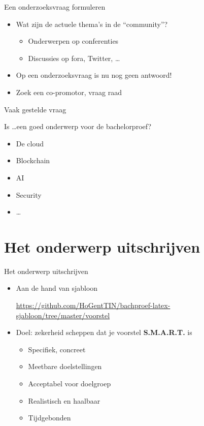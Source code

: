 \documentclass[aspectratio=169]{beamer}
\begin{document}
\begin{frame}{Een onderzoeksvraag formuleren}
  
  \begin{itemize}
    \item Wat zijn de actuele thema's in de ``community''?
    \begin{itemize}
      \item Onderwerpen op conferenties
      \item Discussies op fora, Twitter, \ldots
    \end{itemize}
    \item Op een onderzoeksvraag is nu nog geen antwoord!
    \item Zoek een co-promotor, vraag raad
  \end{itemize}
  
\end{frame}

\begin{frame}{Vaak gestelde vraag}
  
  Is \ldots een goed onderwerp voor de bachelorproef?
  
  \begin{itemize}
    \item De cloud
    \item Blockchain
    \item AI
    \item Security
    \item \ldots
  \end{itemize}
  
\end{frame}

\section{Het onderwerp uitschrijven}

\begin{frame}{Het onderwerp uitschrijven}
  
  \begin{itemize}
    \item Aan de hand van sjabloon
    
    \url{https://github.com/HoGentTIN/bachproef-latex-sjabloon/tree/master/voorstel}
    
    \item Doel: zekerheid scheppen dat je voorstel \textbf{S.M.A.R.T.} is
    \begin{itemize}
      \item Specifiek, concreet
      \item Meetbare doelstellingen
      \item Acceptabel voor doelgroep
      \item Realistisch en haalbaar
      \item Tijdgebonden
    \end{itemize}
  \end{itemize}
\end{frame}
\end{document}
